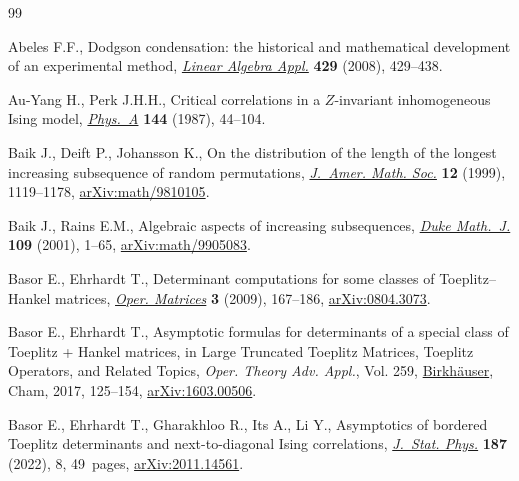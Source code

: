 \documentclass[pdftex]{sigma}
\numberwithin{equation}{section}
\begin{document}
%
%

\begin{thebibliography}{99}
\footnotesize\itemsep=0pt

Abeles F.F., Dodgson condensation: the historical and mathematical development
 of an experimental method, \href{https://doi.org/10.1016/j.laa.2007.11.022}{\textit{Linear Algebra Appl.}} \textbf{429} (2008),
 429--438.

Au-Yang H., Perk J.H.H., Critical correlations in a {$Z$}-invariant
 inhomogeneous {I}sing model, \href{https://doi.org/10.1016/0378-4371(87)90145-2}{\textit{Phys.~A}} \textbf{144} (1987), 44--104.

Baik J., Deift P., Johansson K., On the distribution of the length of the
 longest increasing subsequence of random permutations, \href{https://doi.org/10.1090/S0894-0347-99-00307-0}{\textit{J.~Amer. Math.
 Soc.}} \textbf{12} (1999), 1119--1178, \href{https://arxiv.org/abs/math/9810105}{arXiv:math/9810105}.

Baik J., Rains E.M., Algebraic aspects of increasing subsequences, \href{https://doi.org/10.1215/S0012-7094-01-10911-3}{\textit{Duke
 Math.~J.}} \textbf{109} (2001), 1--65, \href{https://arxiv.org/abs/math/9905083}{arXiv:math/9905083}.

Basor E., Ehrhardt T., Determinant computations for some classes of
 {T}oeplitz--{H}ankel matrices, \href{https://doi.org/10.7153/oam-03-09}{\textit{Oper. Matrices}} \textbf{3} (2009),
 167--186, \href{https://arxiv.org/abs/0804.3073}{arXiv:0804.3073}.

Basor E., Ehrhardt T., Asymptotic formulas for determinants of a special class
 of {T}oeplitz + {H}ankel matrices, in Large {T}runcated {T}oeplitz
 {M}atrices, {T}oeplitz {O}perators, and {R}elated {T}opics, \textit{Oper.
 Theory Adv. Appl.}, Vol. 259, \href{https://doi.org/10.1007/978-3-319-49182-0_9}{Birkh\"auser}, Cham, 2017, 125--154,
 \href{https://arxiv.org/abs/1603.00506}{arXiv:1603.00506}.

Basor E., Ehrhardt T., Gharakhloo R., Its A., Li Y., Asymptotics of bordered
 {T}oeplitz determinants and next-to-diagonal {I}sing correlations,
 \href{https://doi.org/10.1007/s10955-022-02894-7}{\textit{J.~Stat. Phys.}} \textbf{187} (2022), 8, 49~pages,
 \href{https://arxiv.org/abs/2011.14561}{arXiv:2011.14561}.




\end{thebibliography}
\end{document}

